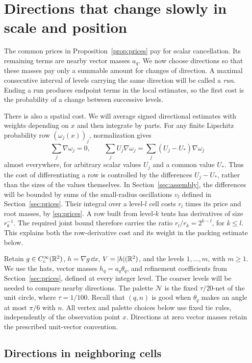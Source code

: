 \section{Directions that change slowly in scale and position}
\label{sec:labels}

The common prices in Proposition~\ref{prop:prices} pay for scalar
cancellation. Its remaining terms are nearby vector masses $a_q$.
We now choose directions so that these masses pay only a summable
amount for changes of direction. A maximal consecutive interval of levels
carrying the same direction will be called a \emph{run}. Ending a
run produces endpoint terms in the local estimates, so the first
cost is the probability of a change between successive levels.

There is also a spatial cost. We will average signed directional
estimates with weights depending on $x$ and then integrate by parts.
For any finite Lipschitz probability row $(\omega_j(x))_j$,
normalization gives
\[
 \sum_j\nabla\omega_j=0,
 \qquad
 \sum_j U_j\nabla\omega_j
   =\sum_j(U_j-U_*)\nabla\omega_j
\]
almost everywhere, for arbitrary scalar values $U_j$ and a common
value $U_*$. Thus the cost of differentiating a row is controlled
by the differences $U_j-U_*$, rather than the sizes of the values
themselves. In Section~\ref{sec:assembly}, the differences will be
bounded by sums of the small-radius oscillations $v_l$ defined in
Section~\ref{sec:prices}. Their integral over a level-$l$ cell costs
$r_l$ times its price and root masses, by \eqref{eq:prices}. A row
built from level-$k$ tents has derivatives of size $r_k^{-1}$.
The required joint bound therefore carries the ratio
$r_l/r_k=2^{k-l}$, for $k\le l$. This explains both the row-derivative
cost and its weight in the packing estimate below.

Retain $g\in C_c^\infty(\mathbb R^2)$, $h=\nabla g\,\dd x$,
$V=|h|(\mathbb R^2)$, and the levels $1,\ldots,m$, with $m\ge1$.
We use the hats, vector masses $h_q=a_q\theta_q$, and refinement
coefficients from Section~\ref{sec:prices}, defined at every integer
level. The coarser levels will be needed to compare nearby directions.
The palette $\mathcal N$ is the fixed $\tau/20$-net of the unit circle,
where $\tau=1/100$. Recall that $(q,n)$ is good when $\theta_q$
makes an angle at most $\pi/6$ with $n$.
All vertex and palette choices below use fixed tie rules, independently
of the observation point $x$. Directions at zero vector masses retain
the prescribed unit-vector convention.

\subsection{Directions in neighboring cells}

